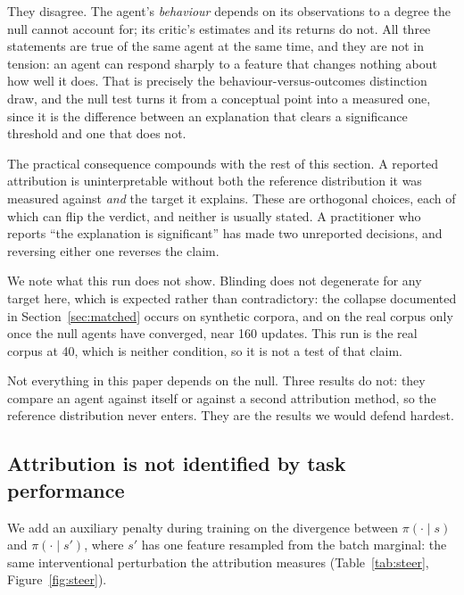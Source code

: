 \documentclass[10pt,twocolumn]{article}
\begin{document}
They disagree. The agent's \emph{behaviour} depends on its observations to a
degree the null cannot account for; its critic's estimates and its returns do
not. All three statements are true of the same agent at the same time, and they
are not in tension: an agent can respond sharply to a feature that changes
nothing about how well it does. That is precisely the behaviour-versus-outcomes
distinction \citet{beechey2023sverl} draw, and the null test turns it from a
conceptual point into a measured one, since it is the difference between an
explanation that clears a significance threshold and one that does not.

The practical consequence compounds with the rest of this section. A reported
attribution is uninterpretable without both the reference distribution it was
measured against \emph{and} the target it explains. These are orthogonal
choices, each of which can flip the verdict, and neither is usually stated. A
practitioner who reports ``the explanation is significant'' has made two
unreported decisions, and reversing either one reverses the claim.

We note what this run does not show. Blinding does not degenerate for any target
here, which is expected rather than contradictory: the collapse documented in
Section~\ref{sec:matched} occurs on synthetic corpora, and on the real corpus
only once the null agents have converged, near 160 updates. This run is the real
corpus at 40, which is neither condition, so it is not a test of that claim.



Not everything in this paper depends on the null. Three results do not: they
compare an agent against itself or against a second attribution method, so the
reference distribution never enters. They are the results we would defend
hardest.

\subsection{Attribution is not identified by task performance}
\label{sec:steering}

We add an auxiliary penalty during training on the divergence between
$\pi(\cdot\mid s)$ and $\pi(\cdot\mid s')$, where $s'$ has one feature resampled
from the batch marginal: the same interventional perturbation the attribution
measures (Table~\ref{tab:steer}, Figure~\ref{fig:steer}).
\end{document}
